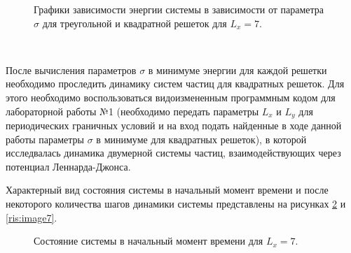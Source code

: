 \documentclass[14pt,a4paper,report]{ncc}
\begin{document}
  \begin{figure}[h]
\caption{Графики зависимости энергии системы в зависимости от параметра $\sigma$ для треугольной и квадратной решеток для $L_x=7$.}
\label{ris:image5}
\end{figure}
\

После вычисления параметров $\sigma$ в минимуме энергии для каждой решетки необходимо проследить динамику систем частиц для квадратных решеток. Для этого необходимо воспользоваться видоизмененным программным кодом для лабораторной работы №1 (необходимо передать параметры $L_x$ и $L_y$ для периодических граничных условий и на вход подать найденные в ходе данной работы параметры $\sigma$ в минимуме для квадратных решеток), в которой исследвалась динамика двумерной системы частиц, взаимодействующих через потенциал Леннарда-Джонса.
\

Характерный вид состояния системы в начальный момент времени и после некоторого количества шагов динамики системы представлены на рисунках \ref{ris:image6} и \ref{ris:image7}. 
\
\begin{figure}[h]
\caption{Состояние системы в начальный момент времени для $L_x=7$.}
\label{ris:image6}
\end{figure}
\
\end{document}
